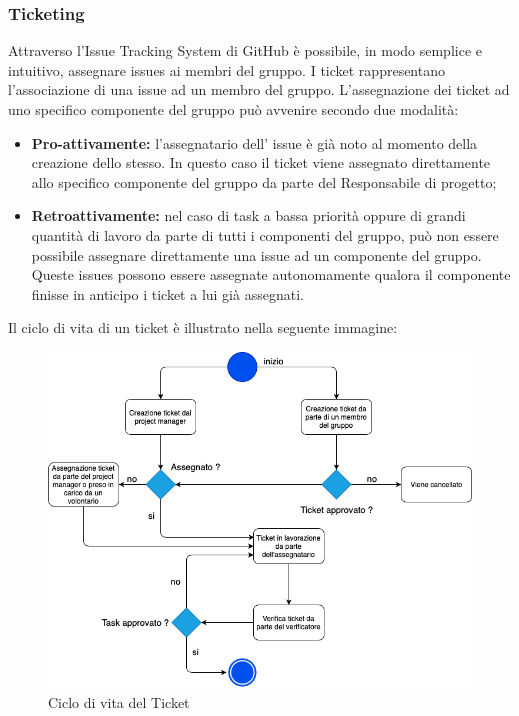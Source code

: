                 \subsubsection{Ticketing}
                    Attraverso l'Issue Tracking System di GitHub è possibile, in modo semplice e intuitivo, assegnare issues ai membri del gruppo.
                    I ticket rappresentano l’associazione di una issue ad un membro del gruppo. L’assegnazione dei ticket ad uno specifico componente del gruppo può avvenire secondo due modalità:
                    \begin{itemize}
                        \item \textbf{Pro-attivamente:} l’assegnatario dell' issue è già noto al momento della creazione dello stesso. In questo caso il ticket viene assegnato direttamente allo specifico componente del gruppo da parte del Responsabile di progetto;
                        \item \textbf{Retroattivamente:} nel caso di task a bassa priorità oppure di grandi quantità di lavoro da parte di tutti i componenti del gruppo, può non essere possibile assegnare direttamente una issue ad un componente del gruppo. Queste issues possono essere assegnate autonomamente qualora il componente finisse in anticipo i ticket a lui già assegnati.\newline
                    \end{itemize}\clearpage
                    Il ciclo di vita di un ticket è illustrato nella seguente immagine:\newline
                    \begin{figure}[!htbp]
                    	    	\centering                 	    	\includegraphics[scale=0.7]{lifeCycleTicket.png}
                    	    	\caption{Ciclo di vita del Ticket}
                    	    \end{figure}
                    
